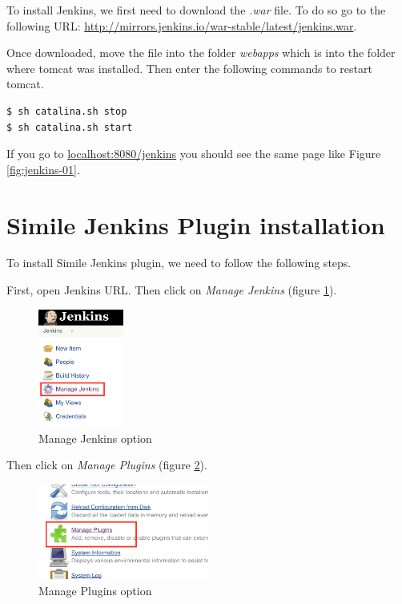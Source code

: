 To install Jenkins, we first need to download the \emph{.war} file. To do so go to the following URL: \url{http://mirrors.jenkins.io/war-stable/latest/jenkins.war}.

Once downloaded, move the file into the folder \emph{webapps} which is into the folder where tomcat was installed. Then enter the following commands to restart tomcat.

\begin{verbatim}
$ sh catalina.sh stop
$ sh catalina.sh start
\end{verbatim}

If you go to \url{localhost:8080/jenkins} you should see the same page like Figure \ref{fig:jenkins-01}.

\section{Simile Jenkins Plugin installation}
To install Simile Jenkins plugin, we need to follow the following steps.

First, open Jenkins URL. Then click on \textit{Manage Jenkins} (figure \ref{fig:jenkins-plugin-01}).

\begin{figure}[H]
	\centering
    \includegraphics[width=0.25\textwidth]{grafiken/jenkins-plugin-01}
    \caption{Manage Jenkins option}
    \label{fig:jenkins-plugin-01}
\end{figure}

Then click on \textit{Manage Plugins} (figure \ref{fig:jenkins-plugin-02}).

\begin{figure}[H]
	\centering
    \includegraphics[width=0.5\textwidth]{grafiken/jenkins-plugin-02}
    \caption{Manage Plugins option}
    \label{fig:jenkins-plugin-02}
\end{figure}

